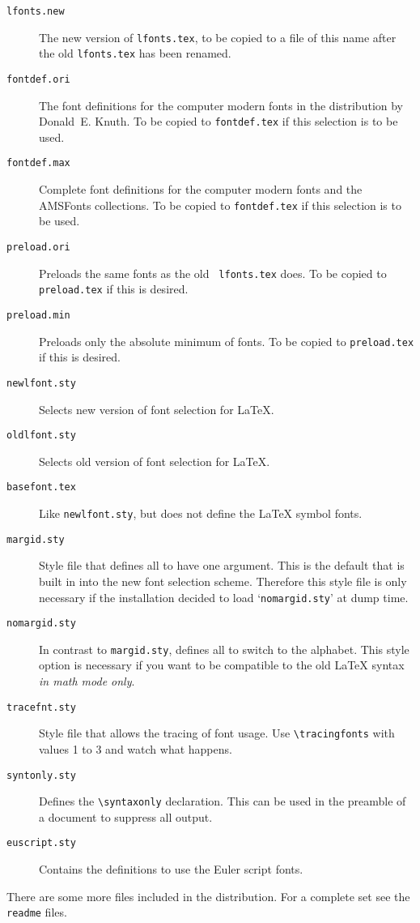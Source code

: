  \begin{description}
  \item[\tt lfonts.new]
   The new version of {\tt lfonts.tex}, to be copied to a file of
   this name after the old {\tt lfonts.tex} has been renamed.
  \item[\tt fontdef.ori]
   The font definitions for the computer modern fonts in the
   distribution by
   Donald~E. Knuth.  To be copied to {\tt fontdef.tex} if this
   selection is to be used.
  \item[\tt fontdef.max]
   Complete font definitions for the computer modern fonts and the
   AMSFonts collections.  To be copied to {\tt fontdef.tex} if this
   selection is to be used.
  \item[\tt preload.ori]
   Preloads the same fonts as the old {\tt
   lfonts.tex} does.  To be copied
   to {\tt preload.tex} if this is desired.
  \item[\tt preload.min]
   Preloads only the absolute minimum of fonts.  To be copied
   to {\tt preload.tex} if this is desired.
  \item[\tt newlfont.sty]
   Selects new version of font selection for \LaTeX.
  \item[\tt oldlfont.sty]
   Selects old version of font selection for \LaTeX.
  \item[\tt basefont.tex]
   Like {\tt newlfont.sty}, but does not define the \LaTeX{} symbol
   fonts.
  \item[\tt margid.sty]
   Style file that
   defines all  to have one argument.
   This is the default that is built in into the new font selection
   scheme.  Therefore this style file is only necessary if the
   installation decided to load `{\tt nomargid.sty}' at dump time.
  \item[\tt nomargid.sty]
   In contrast to {\tt margid.sty}, defines all
    to switch to the
   alphabet.  This style option is necessary if you want to be
   compatible to the old \LaTeX{} syntax {\em in math mode only}.
  \item[\tt tracefnt.sty]
   Style file that allows the tracing of font usage.
   Use \verb=\tracingfonts= with values 1 to 3 and watch
   what happens.
  \item[\tt syntonly.sty]
   Defines the \verb+\syntaxonly+ declaration.  This can be used
   in the preamble of a document to suppress all output.
  \item[\tt euscript.sty]
   Contains the definitions to use the Euler script fonts.
 \end{description}
There are some more files included in the distribution. For a complete
 set see the {\tt readme} files. 

